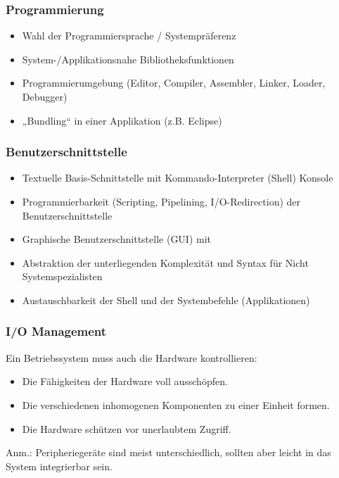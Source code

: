 \documentclass[a4paper, 10pt]{article}
\begin{document}
\subsubsection{Programmierung}
\begin{itemize}
\item Wahl der Programmiersprache / Systempräferenz
\item System-/Applikationsnahe Bibliotheksfunktionen
\item Programmierumgebung (Editor, Compiler, Assembler, Linker, Loader, Debugger)
\item „Bundling“ in einer Applikation (z.B. Eclipse)
\end{itemize}

\subsubsection{Benutzerschnittstelle}
\begin{itemize}
\item Textuelle Basis-Schnittstelle mit Kommando-Interpreter (Shell) Konsole
\item Programmierbarkeit (Scripting, Pipelining, I/O-Redirection) der Benutzerschnittstelle
\item Graphische Benutzerschnittstelle (GUI) mit
\item Abstraktion der unterliegenden Komplexität und Syntax für Nicht Systemspezialisten
\item Austauschbarkeit der Shell und der Systembefehle (Applikationen)
\end{itemize}


\subsubsection{I/O Management}
Ein Betriebssystem muss auch die Hardware kontrollieren:
\begin{itemize}
\item Die Fähigkeiten der Hardware voll ausschöpfen.
\item Die verschiedenen inhomogenen Komponenten zu einer Einheit formen.
\item Die Hardware schützen vor unerlaubtem Zugriff.
\end{itemize}
Anm.: Peripheriegeräte sind meist unterschiedlich, sollten aber leicht in das System integrierbar sein.
\end{document}
